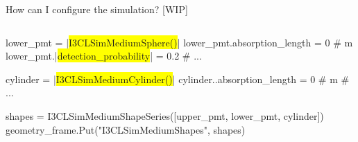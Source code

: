 \begin{frame}[t,fragile]{How can I configure the simulation? [WIP]}
\begin{column}[t]{0.6\textwidth}
\begin{onlyenv}
\begin{python}
        lower_pmt = |\colorbox{yellow}{I3CLSimMediumSphere()}|
        lower_pmt.absorption_length = 0 # m
        lower_pmt.|\colorbox{yellow}{detection\_probability}| = 0.2
        # ...
        
        cylinder = |\colorbox{yellow}{I3CLSimMediumCylinder()}|
        cylinder..absorption_length = 0 # m
        # ...
        
        shapes = I3CLSimMediumShapeSeries([upper_pmt, lower_pmt, cylinder])
        geometry_frame.Put("I3CLSimMediumShapes", shapes)
      \end{python}
    \end{onlyenv}
    
  \end{column}
\end{frame}

